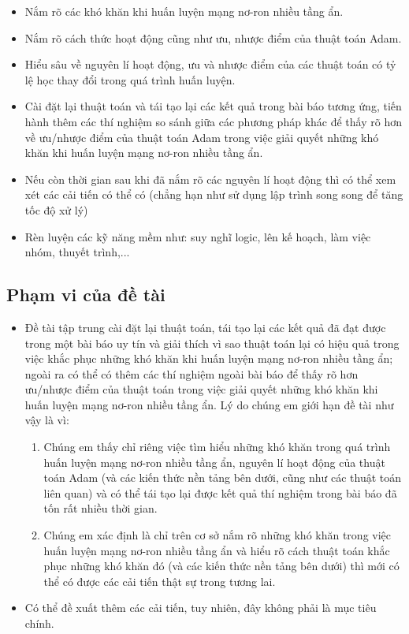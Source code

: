 \documentclass{article}[14pt]
\begin{document}
{    \begin{itemize}
        \item Nắm rõ các khó khăn khi huấn luyện mạng nơ-ron nhiều tầng ẩn.
        \item Nắm rõ cách thức hoạt động cũng như ưu, nhược điểm của thuật toán Adam.
        \item Hiểu sâu về nguyên lí hoạt động, ưu và nhược điểm của các thuật toán có tỷ lệ học thay đổi trong quá trình huấn luyện.
        \item Cài đặt lại thuật toán và tái tạo lại các kết quả trong bài báo tương ứng, tiến hành thêm các thí nghiệm so sánh giữa các phương pháp khác để thấy rõ hơn về ưu/nhược điểm của thuật toán Adam trong việc giải quyết những khó khăn khi huấn luyện mạng nơ-ron nhiều tầng ẩn.
        \item Nếu còn thời gian sau khi đã nắm rõ các nguyên lí hoạt động thì có thể xem xét các cải tiến có thể có (chẳng hạn như sử dụng lập trình song song để tăng tốc độ xử lý)
        \item Rèn luyện các kỹ năng mềm như: suy nghĩ logic, lên kế hoạch, làm việc nhóm, thuyết trình,...
    \end{itemize}
    
    \subsection{Phạm vi của đề tài}
    
    \begin{itemize}
        \item Đề tài tập trung cài đặt lại thuật toán, tái tạo lại các kết quả đã đạt được trong một bài báo uy tín và giải thích vì sao thuật toán lại có hiệu quả trong việc khắc phục những khó khăn khi huấn luyện mạng nơ-ron nhiều tầng ẩn; ngoài ra có thể có thêm các thí nghiệm ngoài bài báo để thấy rõ hơn ưu/nhược điểm của thuật toán trong việc giải quyết những khó khăn khi huấn luyện mạng nơ-ron nhiều tầng ẩn. Lý do chúng em giới hạn đề tài như vậy là vì:
        \begin{enumerate}
            \item Chúng em thấy chỉ riêng việc tìm hiểu những khó khăn trong quá trình huấn luyện mạng nơ-ron nhiều tầng ẩn, nguyên lí hoạt động của thuật toán Adam (và các kiến thức nền tảng bên dưới, cũng như các thuật toán liên quan) và có thể tái tạo lại được kết quả thí nghiệm trong bài báo đã tốn rất nhiều thời gian.
            \item Chúng em xác định là chỉ trên cơ sở nắm rõ những khó khăn trong việc huấn luyện mạng nơ-ron nhiều tầng ẩn và hiểu rõ cách thuật toán khắc phục những khó khăn đó (và các kiến thức nền tảng bên dưới) thì mới có thể có được các cải tiến thật sự trong tương lai.
        \end{enumerate}
   \item Có thể đề xuất thêm các cải tiến, tuy nhiên, đây không phải là mục tiêu chính.
    \end{itemize}
    
}
\end{document}
